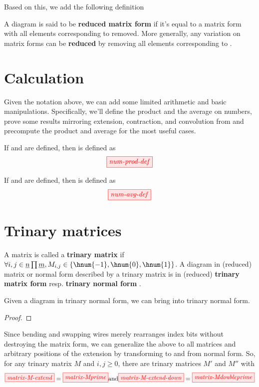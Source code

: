 Based on this, we add the following definition
\begin{definition}
    A diagram is said to be \textbf{reduced matrix form} if it's equal to a
    matrix form with all elements corresponding to  removed. More
    generally, any variation on matrix forms can be \textbf{reduced} by removing
    all elements corresponding to .
\end{definition}

\section{Calculation}\label{sec:calculation}
Given the notation above, we can add some limited arithmetic and basic
manipulations. Specifically, we'll define the product and the average on
numbers, prove some results mirroring extension, contraction, and convolution
from \cite{backens2018zhcalculus} and precompute the product and average for the
most useful cases.

\begin{definition}
    If  and  are defined, then  is defined as
    $$\tikzfig{num-prod-def}$$
\end{definition}

\begin{definition}
    If  and  are defined, then  is defined as
    $$\tikzfig{num-avg-def}$$
\end{definition}


\section{Trinary matrices}

\begin{definition}
    A matrix  is called a \textbf{trinary matrix} if%
    $\forall i,j \in \underline{n} \prod \underline{m}, M_{i,j} \in \{\hnum{-1},%
    \hnum{0},\hnum{1}\}$. A diagram in (reduced) matrix or normal form described
    by a trinary matrix is in (reduced) \textbf{trinary matrix form} resp.
    \textbf{trinary normal form} .
\end{definition}

\begin{lemma}\label{lem:extclosed}
    Given a diagram  in trinary normal form, we can bring
     into trinary normal form.
\end{lemma}
\begin{proof}
\end{proof}
\begin{corollary}
    Since bending and swapping wires merely rearranges index bits without
    destroying the matrix form, we can generalize the above to all matrices and
    arbitrary positions of the extension by transforming to and from normal
    form. So, for any trinary matrix $M$ and $i, j \geq 0$, there are trinary
    matrices $M'$ and $M''$ with
    $$\tikzfig{matrix-M-extend} = \tikzfig{matrix-Mprime} \text{and}%
    \tikzfig{matrix-M-extend-down} = \tikzfig{matrix-Mdoubleprime}$$
\end{corollary}

